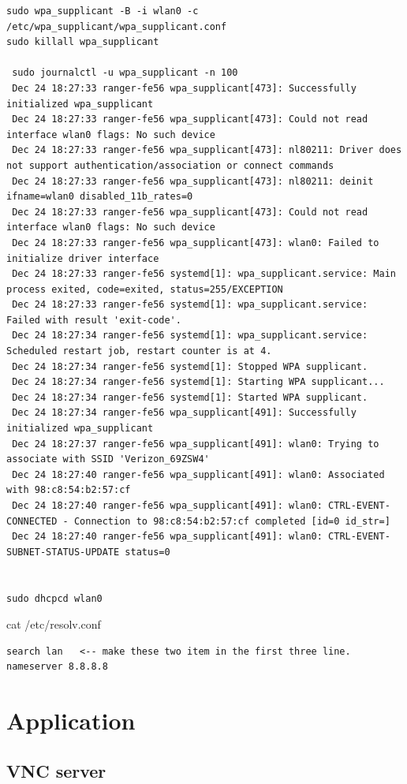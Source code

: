 \documentclass[paper=8.5in:11in, twoside, 12pt, pagesize=pdftex]{book}
\begin{document}
\begin{lstlisting}
sudo wpa_supplicant -B -i wlan0 -c /etc/wpa_supplicant/wpa_supplicant.conf
sudo killall wpa_supplicant

 sudo journalctl -u wpa_supplicant -n 100
 Dec 24 18:27:33 ranger-fe56 wpa_supplicant[473]: Successfully initialized wpa_supplicant
 Dec 24 18:27:33 ranger-fe56 wpa_supplicant[473]: Could not read interface wlan0 flags: No such device
 Dec 24 18:27:33 ranger-fe56 wpa_supplicant[473]: nl80211: Driver does not support authentication/association or connect commands
 Dec 24 18:27:33 ranger-fe56 wpa_supplicant[473]: nl80211: deinit ifname=wlan0 disabled_11b_rates=0
 Dec 24 18:27:33 ranger-fe56 wpa_supplicant[473]: Could not read interface wlan0 flags: No such device
 Dec 24 18:27:33 ranger-fe56 wpa_supplicant[473]: wlan0: Failed to initialize driver interface
 Dec 24 18:27:33 ranger-fe56 systemd[1]: wpa_supplicant.service: Main process exited, code=exited, status=255/EXCEPTION
 Dec 24 18:27:33 ranger-fe56 systemd[1]: wpa_supplicant.service: Failed with result 'exit-code'.
 Dec 24 18:27:34 ranger-fe56 systemd[1]: wpa_supplicant.service: Scheduled restart job, restart counter is at 4.
 Dec 24 18:27:34 ranger-fe56 systemd[1]: Stopped WPA supplicant.
 Dec 24 18:27:34 ranger-fe56 systemd[1]: Starting WPA supplicant...
 Dec 24 18:27:34 ranger-fe56 systemd[1]: Started WPA supplicant.
 Dec 24 18:27:34 ranger-fe56 wpa_supplicant[491]: Successfully initialized wpa_supplicant
 Dec 24 18:27:37 ranger-fe56 wpa_supplicant[491]: wlan0: Trying to associate with SSID 'Verizon_69ZSW4'
 Dec 24 18:27:40 ranger-fe56 wpa_supplicant[491]: wlan0: Associated with 98:c8:54:b2:57:cf
 Dec 24 18:27:40 ranger-fe56 wpa_supplicant[491]: wlan0: CTRL-EVENT-CONNECTED - Connection to 98:c8:54:b2:57:cf completed [id=0 id_str=]
 Dec 24 18:27:40 ranger-fe56 wpa_supplicant[491]: wlan0: CTRL-EVENT-SUBNET-STATUS-UPDATE status=0
 

sudo dhcpcd wlan0
\end{lstlisting}


cat /etc/resolv.conf
\begin{lstlisting}
search lan   <-- make these two item in the first three line.
nameserver 8.8.8.8
\end{lstlisting}
 
\section{Application}
	
\subsection{VNC server}
\end{document}
